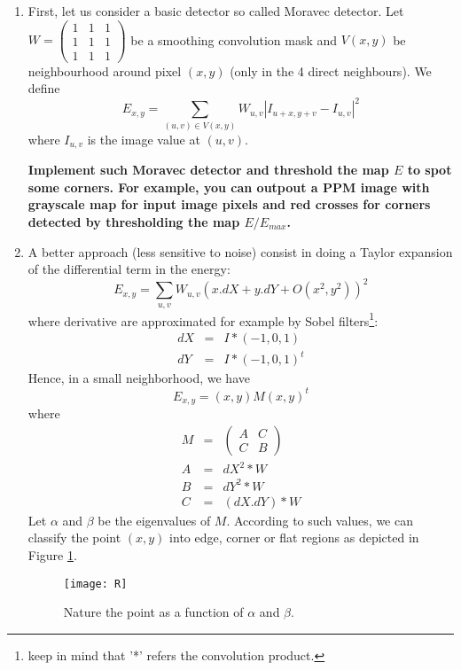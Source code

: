 \documentclass[a4paper, 11pt, french]{article}
\begin{document}
\begin{enumerate}
 	\item First, let us consider a basic detector so called Moravec detector. Let  $W=\left(\begin{array}{ccc} 1 & 1 & 1\\1 & 1 & 1\\1 & 1 & 1\end{array}\right)$ be a smoothing convolution mask and $V(x,y)$ be neighbourhood around pixel $(x,y)$ (only in the 4 direct neighbours). We define 
	\begin{equation}
	\label{eq1}
	E_{x,y}=\sum_{(u,v)\in V(x,y)} W_{u,v}\left|I_{u+x,y+v}-I_{u,v}\right|^2
	\end{equation}
	where $I_{u,v}$ is the image value at $(u,v)$.
 
	{\bf Implement such Moravec detector and threshold the map $E$ to spot some corners. For example, you can outpout a PPM image with grayscale map  for input image pixels and red crosses for corners detected by thresholding the map $E/E_{max}$.}

	\item A better approach (less sensitive to noise) consist in doing a Taylor expansion of the differential term in the energy:
	\begin{equation}
		E_{x,y}=\sum_{u,v} W_{u,v}\left(x.dX+y.dY+O(x^2,y^2)\right)^2
	\end{equation}
	where derivative are approximated for example by Sobel filters\footnote{keep in mind that '*' refers the convolution product.}:
	\begin{eqnarray}
		dX & = & I * (-1,0,1) \\
		dY & = & I * (-1,0,1)^t
	\end{eqnarray}  
	Hence, in a  small neighborhood, we have 
	$$E_{x,y}=(x,y) M (x,y)^t$$ where
	\begin{eqnarray}
		M & = &\left(\begin{array}{cc} A & C\\ C & B\end{array}\right)\\
		A & = & dX^2 *  W \\
		B & = & dY^2 * W \\
		C & = & (dX.dY)*  W 
	\end{eqnarray}
	Let $\alpha$ and $\beta$ be the eigenvalues of $M$. According to such values, we can classify the point $(x,y)$ into edge, corner or flat regions as depicted in Figure \ref{fig.R}.

	\begin{figure}[htbp]
		\centerline{\texttt{[image: R]}}
		\caption{Nature the point as a function of $\alpha$ and $\beta$.} \label{fig.R}
	\end{figure}


\end{enumerate}
\end{document}
